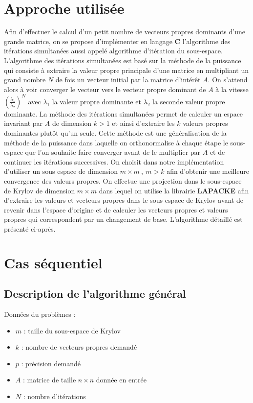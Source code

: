 \documentclass[11pt,a4paper]{article}
\begin{document}
\section{Approche utilisée}
	Afin d'effectuer le calcul d'un petit nombre de vecteurs propres dominants d'une grande matrice, on se propose d'implémenter en langage \textbf{C} l'algorithme des itérations simultanées aussi appelé algorithme d'itération du sous-espace.
	L'algorithme des itérations simultanées est basé sur la méthode de la puissance qui consiste à extraire la valeur propre principale d'une matrice en multipliant un grand nombre $N$ de fois un vecteur initial par la matrice d'intérêt $A$. On s'attend alors à voir converger le vecteur vers le vecteur propre dominant de $A$ à la vitesse $\left(\frac{\lambda_1}{\lambda_2}\right)^N$ avec $\lambda_1$ la valeur propre dominante et $\lambda_2$ la seconde valeur propre dominante.
	La méthode des itérations simultanées permet de calculer un espace invariant par $A$ de dimension $k > 1$ et ainsi d'extraire les $k$ valeurs propres dominantes plutôt qu'un seule. Cette méthode est une généralisation de la méthode de la puissance dans laquelle on orthonormalise à chaque étape le sous-espace que l'on souhaite faire converger avant de le multiplier par $A$ et de continuer les itérations successives. On choisit dans notre implémentation d'utiliser un sous espace de dimension $m\times m\:,\: m > k$ afin d'obtenir une meilleure convergence des valeurs propres. On effectue une projection dans le sous-espace de Krylov de dimension $m\times m$ dans lequel on utilise la librairie \textbf{LAPACKE} afin d'extraire les valeurs et vecteurs propres dans le sous-espace de Krylov avant de revenir dans l'espace d'origine et de calculer les vecteurs propres et valeurs propres qui correspondent par un changement de base. L'algorithme détaillé est présenté ci-après.

\section{Cas séquentiel}

	\subsection{Description de l'algorithme général}

		Données du problèmes :

		\begin{itemize}
			\item $m$ : taille du sous-espace de Krylov
			\item $k$ : nombre de vecteurs propres demandé
			\item $p$ : précision demandé
			\item $A$ : matrice de taille $n\times n$ donnée en entrée
			\item $N$ : nombre d'itérations
		\end{itemize}
\end{document}
